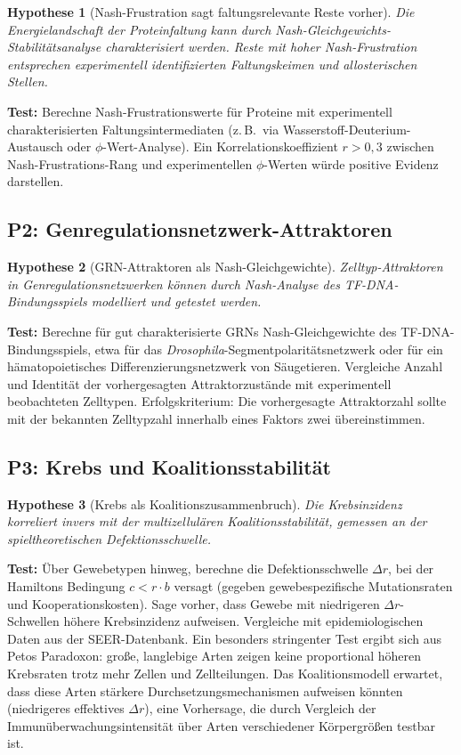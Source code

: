 \documentclass[12pt,a4paper]{article}
\newtheorem{hypothesis}{Hypothese}
\theoremstyle{remark}
\begin{document}
\begin{hypothesis}[Nash-Frustration sagt faltungsrelevante Reste vorher]
Die Energielandschaft der Proteinfaltung kann durch Nash-Gleichgewichts-Stabilitätsanalyse charakterisiert werden. Reste mit hoher Nash-Frustration entsprechen experimentell identifizierten Faltungskeimen und allosterischen Stellen.
\end{hypothesis}

\textbf{Test:} Berechne Nash-Frustrationswerte für Proteine mit experimentell charakterisierten Faltungsintermediaten (z.\,B.\ via Wasserstoff-Deuterium-Austausch oder $\phi$-Wert-Analyse). Ein Korrelationskoeffizient $r > 0{,}3$ zwischen Nash-Frustrations-Rang und experimentellen $\phi$-Werten würde positive Evidenz darstellen.

\subsection{P2: Genregulationsnetzwerk-Attraktoren}

\begin{hypothesis}[GRN-Attraktoren als Nash-Gleichgewichte]
Zelltyp-Attraktoren in Genregulationsnetzwerken können durch Nash-Analyse des TF-DNA-Bindungsspiels modelliert und getestet werden.
\end{hypothesis}

\textbf{Test:} Berechne für gut charakterisierte GRNs Nash-Gleichgewichte des TF-DNA-Bindungsspiels, etwa für das \textit{Drosophila}-Segmentpolaritätsnetzwerk oder für ein hämatopoietisches Differenzierungsnetzwerk von Säugetieren. Vergleiche Anzahl und Identität der vorhergesagten Attraktorzustände mit experimentell beobachteten Zelltypen. Erfolgskriterium: Die vorhergesagte Attraktorzahl sollte mit der bekannten Zelltypzahl innerhalb eines Faktors zwei übereinstimmen.

\subsection{P3: Krebs und Koalitionsstabilität}

\begin{hypothesis}[Krebs als Koalitionszusammenbruch]
Die Krebsinzidenz korreliert invers mit der multizellulären Koalitionsstabilität, gemessen an der spieltheoretischen Defektionsschwelle.
\end{hypothesis}

\textbf{Test:} Über Gewebetypen hinweg, berechne die Defektionsschwelle $\Delta r$, bei der Hamiltons Bedingung $c < r \cdot b$ versagt (gegeben gewebespezifische Mutationsraten und Kooperationskosten). Sage vorher, dass Gewebe mit niedrigeren $\Delta r$-Schwellen höhere Krebsinzidenz aufweisen. Vergleiche mit epidemiologischen Daten aus der SEER-Datenbank. Ein besonders stringenter Test ergibt sich aus Petos Paradoxon: große, langlebige Arten zeigen keine proportional höheren Krebsraten trotz mehr Zellen und Zellteilungen. Das Koalitionsmodell erwartet, dass diese Arten stärkere Durchsetzungsmechanismen aufweisen könnten (niedrigeres effektives $\Delta r$), eine Vorhersage, die durch Vergleich der Immunüberwachungsintensität über Arten verschiedener Körpergrößen testbar ist.
\end{document}
